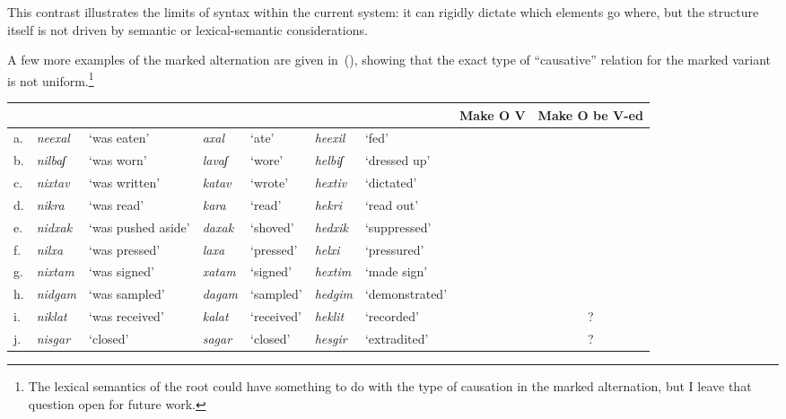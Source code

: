 This contrast illustrates the limits of syntax within the current system: it can rigidly dictate which elements go where, but the structure itself is not driven by semantic or lexical-semantic considerations.

A few more examples of the marked alternation are given in~(\nextx), showing that the exact type of ``causative'' relation for the marked variant is not uniform.\footnote{The lexical semantics of the root could have something to do with the type of causation in the marked alternation, but I leave that question open for future work.}
\ex\label{vd:ex:triplets-caus}
\xe
\begin{small}
\hspace{-4em}\begin{tabular}{l|ll|ll|llcc}
		\multicolumn{7}{c}{}		& Make O V	& Make O be V-ed\\\hline
		 a.& \emph{neexal}	& `was eaten'	& \emph{axal} & `ate'		& \emph{heexil} & `fed'			& \cmark	& \xmark\\
		 b.& \emph{nilbaʃ}	& `was worn'	& \emph{lavaʃ} & `wore' 	& \emph{helbiʃ}	&	`dressed up' 	& \cmark	& \xmark\\\hdashline
		 c.& \emph{nixtav} & `was written' & \emph{katav} & `wrote' & \emph{hextiv} & `dictated' & \xmark	& \cmark\\
		d.& \emph{nikra}	& `was read'	& \emph{kara} & `read'		& \emph{hekri}	& `read out'	& \xmark	& \cmark \\
		e.&	\emph{nidxak}	& `was pushed aside'	& \emph{daxak}	& `shoved'	& \emph{hedxik}	& `suppressed'\footnotemark	& \xmark	& \cmark\\
		f.& \emph{nilxa\texttslig}	& `was pressed' &  \emph{laxa\texttslig} & `pressed'	& \emph{helxi\texttslig} & `pressured'	& \xmark	& \cmark \\\hdashline
		 g.& \emph{nixtam}	& `was signed'	& \emph{xatam} & `signed'	& \emph{hextim}	& `made sign'	& \cmark	& \cmark\\\hdashline
		h. & \emph{nidgam} & `was sampled'	& \emph{dagam} & `sampled'	& \emph{hedgim}		& `demonstrated'	& \xmark	& \xmark\\
		i. & \emph{niklat} & `was received' & \emph{kalat} & `received' & \emph{heklit} & `recorded' & \xmark & \cmark?\\
		j.& \emph{nisgar}	& `closed'	& \emph{sagar} & `closed'		& \emph{hesgir} & `extradited'	& \xmark	& \cmark?\\
		\end{tabular}
\end{small}

